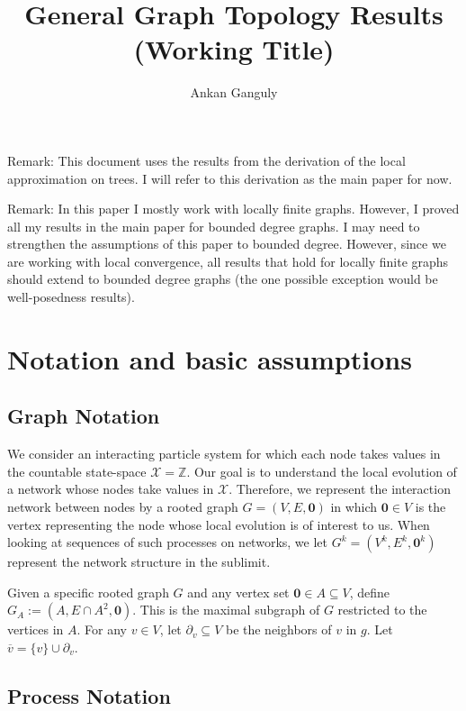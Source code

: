 \documentclass[12pt]{article}
\newcommand{\skipLine}{\vspace{12pt}}
\newcommand{\mb}{\mathbb}
\newcommand{\mc}{\mathcal}
\newcommand{\ov}{\overline}
\newcommand{\ind}{\hspace{24pt}}
\newcommand{\defeq}{:=}								%
\newcommand{\sta}{\mc{X}}							%
\newcommand{\neigh}[1]{\partial_{#1}}				%
\newcommand{\cl}[1]{\ov{#1}}						%
\renewcommand{\root}{\mathbf{0}}
\newcommand{\indx}[1]{^{#1}}						%
\newcommand{\subg}[1]{_{#1}}						%
\begin{document}
\title{General Graph Topology Results (Working Title)}
\author{Ankan Ganguly}

\maketitle

Remark: This document uses the results from the derivation of the local approximation on trees. I will refer to this derivation as the main paper for now.

\skipLine

Remark: In this paper I mostly work with locally finite graphs. However, I proved all my results in the main paper for bounded degree graphs. I may need to strengthen the assumptions of this paper to bounded degree. However, since we are working with local convergence, all results that hold for locally finite graphs should extend to bounded degree graphs (the one possible exception would be well-posedness results).

\section{Notation and basic assumptions}
\label{not}

\subsection{Graph Notation}
\label{g::not}

We consider an interacting particle system for which each node takes values in the countable state-space \(\sta = \mb{Z}\). Our goal is to understand the local evolution of a network whose nodes take values in \(\sta\). Therefore, we represent the interaction network between nodes by a rooted graph \(G = (V,E,\root)\) in which \(\root \in V\) is the vertex representing the node whose local evolution is of interest to us. When looking at sequences of such processes on networks, we let \(G\indx{k} = (V\indx{k},E\indx{k},\root\indx{k})\) represent the network structure in the sublimit.

\ind Given a specific rooted graph \(G\) and any vertex set \(\root \in A \subseteq V\), define \(G\subg{A} \defeq (A,E\cap A^2,\root)\). This is the maximal subgraph of \(G\) restricted to the vertices in \(A\). For any \(v \in V\), let \(\neigh{v}\subseteq V\) be the neighbors of \(v\) in \(g\). Let \(\cl{v} = \{v\}\cup\neigh{v}\). 

\subsection{Process Notation}
\label{p::not}
\end{document}
